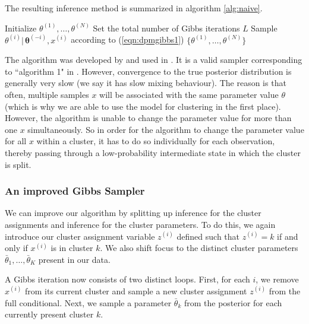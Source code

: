 \documentclass[final,3p,times,twocolumn]{elsarticle}
\let\bs\boldsymbol
\begin{document}
The resulting inference method is summarized in algorithm \ref{alg:naive}.
\begin{algorithm}
\caption{Na{\"i}ve Gibbs sampler for DP mixtures}
\label{alg:naive}
\begin{algorithmic}[1]
\State Initialize $\theta^{(1)},\dots,\theta^{(N)}$
\State Set the total number of Gibbs iterations $L$
\State Sample $\theta^{(i)}|\,\bs\theta^{(-i)},x^{(i)}$ according to (\ref{eqn:dpmgibbs1})
\EndFor
\EndFor
\State\Return $\{\theta^{(1)},\dots,\theta^{(N)}\}$
\end{algorithmic}
\end{algorithm}

The algorithm was developed by \cite{escobar1994} and used in \cite{escobar1995}.
It is a valid sampler corresponding to ``algorithm 1" in \cite{neal2000}.
However, convergence to the true posterior distribution is generally very slow (we say it has slow mixing behaviour).
The reason is that often, multiple samples $x$ will be associated with the same parameter value $\theta$ (which is why we are able to use the model for clustering in the first place).
However, the algorithm is unable to change the parameter value for more than one $x$ simultaneously. 
So in order for the algorithm to change the parameter value for all $x$ within a cluster, it has to do so individually for each observation, thereby passing through a low-probability intermediate state in which the cluster is split.

\subsubsection*{\normalfont \small \bfseries An improved Gibbs Sampler}
We can improve our algorithm by splitting up inference for the cluster assignments and inference for the cluster parameters.
To do this, we again introduce our cluster assignment variable $z^{(i)}$ defined such that $z^{(i)}=k$ if and only if $x^{(i)}$ is in cluster $k$.
We also shift focus to the distinct cluster parameters $\bar \theta_1,\dots,\bar \theta_K$ present in our data. 

A Gibbs iteration now consists of two distinct loops.
First, for each $i$, we remove $x^{(i)}$ from its current cluster and sample a new cluster assignment $z^{(i)}$ from the full conditional.
Next, we sample a parameter $\bar \theta_k$ from the posterior for each currently present cluster $k$.
\end{document}
